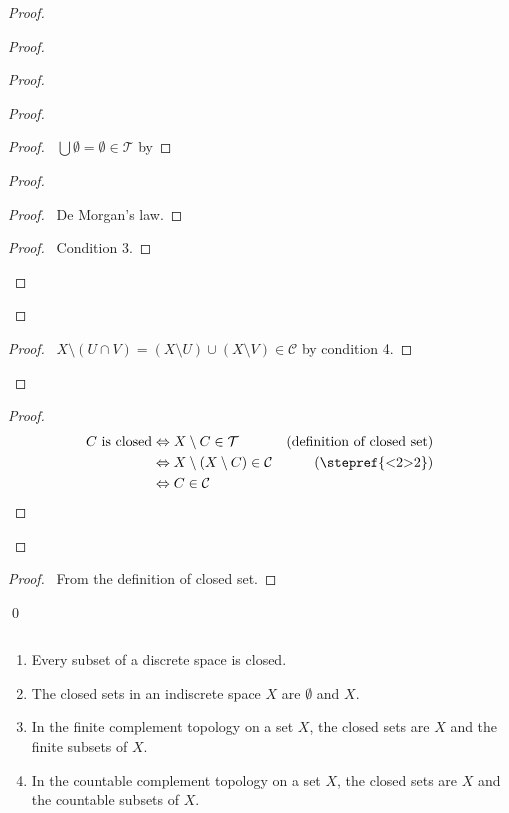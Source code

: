 \begin{proof}
\begin{proof}
\begin{proof}
\begin{proof}
        \begin{proof}
          \pf\ $\bigcup \emptyset = \emptyset \in \mathcal{T}$ by 
        \end{proof}
        \begin{proof}
          \begin{proof}
            \pf\ De Morgan's law.
          \end{proof}
          \begin{proof}
            \pf\ Condition 3.
          \end{proof}
        \end{proof}
      \end{proof}
      \begin{proof}
        \pf\ $X \setminus (U \cap V) = (X \setminus U) \cup (X \setminus V) \in \mathcal{C}$ by condition 4.
      \end{proof}
    \end{proof}
    \begin{proof}
      \pf
      \begin{align*}
        C \text{ is closed} & \Leftrightarrow X \setminus C \in \mathcal{T} & (\text{definition of closed set}) \\
        & \Leftrightarrow X \setminus (X \setminus C) \in \mathcal{C} & (\text{\stepref{<2>2}})\\
        & \Leftrightarrow C \in \mathcal{C}
      \end{align*}
    \end{proof}
  \end{proof}
  \begin{proof}
    \pf\ From the definition of closed set.
  \end{proof}
  \qed
\end{proof}

\begin{ex}$ $
  \begin{enumerate}
    \item Every subset of a discrete space is closed.
    \item The closed sets in an indiscrete space $X$ are $\emptyset$ and $X$.
    \item In the finite complement topology on a set $X$, the closed sets are $X$ and the finite subsets of $X$.
    \item In the countable complement topology on a set $X$, the closed sets are $X$ and the countable subsets of $X$.
  \end{enumerate}
\end{ex}

